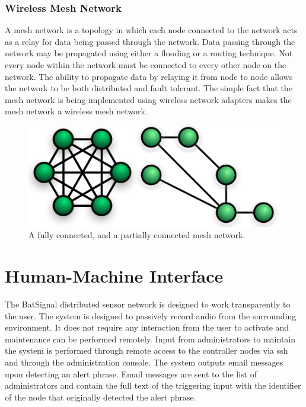 \documentclass[11pt,a4paper]{article}
\begin{document}
\subsubsection{Wireless Mesh Network}
A mesh network is a topology in which each node connected to the network acts as a relay for data being passed through the network. Data passing through the network may be propagated using either a flooding or a routing technique. Not every node within the network must be connected to every other node on the network. The ability to propagate data by relaying it from node to node allows the network to be both distributed and fault tolerant. The simple fact that the mesh network is being implemented using wireless network adapters makes the mesh network a wireless mesh network. 
\begin{figure}[H]
	\centering
		\includegraphics[width=\textwidth, keepaspectratio=true]{Graphics/mesh-networks.jpg}
	\caption{A fully connected, and a partially connected mesh network.}
\end{figure}


\section{Human-Machine Interface}
The BatSignal distributed sensor network is designed to work transparently to the user. The system is designed to passively record audio from the surrounding environment. It does not require any interaction from the user to activate and maintenance can  be performed remotely. Input from administrators to maintain the system is performed through remote access to the controller nodes via ssh and through the administration console. The system outputs email messages upon detecting an alert phrase. Email messages are sent to the list of administrators and contain the full text of the triggering input with the identifier of the node that originally detected the alert phrase.
\end{document}

